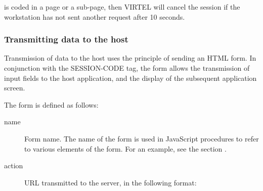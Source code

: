 \documentclass[letterpaper,10pt,english]{sphinxmanual}
\begin{document}
is coded in a page or a sub-page, then VIRTEL will cancel the session if the workstation has not sent another request after 10 seconds.


\subsubsection{Transmitting data to the host}
\label{\detokenize{User_Guide:transmitting-data-to-the-host}}\label{\detokenize{User_Guide:v457ug-transmitting-data}}
Transmission of data to the host uses the principle of sending an HTML form. In conjunction with the SESSION-CODE tag, the form allows the transmission of input fields to the host application, and the     display of the subsequent application screen.

The form is defined as follows:

\begin{sphinxVerbatim}[commandchars=\\\{\}]
   
            
\end{sphinxVerbatim}
\begin{description}
\item[{name}] \leavevmode
Form name. The name of the form is used in JavaScript procedures to refer to various elements of the form. For an example, see the section {\hyperref[\detokenize{User_Guide:v457ug-cursor-management}]{}}.

\item[{action}] \leavevmode
URL transmitted to the server, in the following format:

\end{description}
\end{document}
